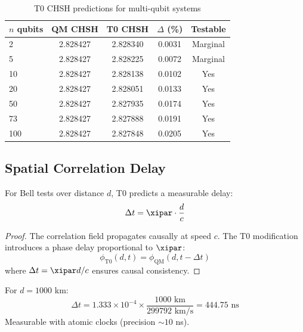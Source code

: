 \begin{table}[h]
	\centering
	\caption{T0 CHSH predictions for multi-qubit systems}
	\label{tab:chsh_predictions}
	\begin{tabular}{@{}lcccc@{}}
		\toprule
		$n$ qubits & QM CHSH & T0 CHSH & $\Delta$ (\%) & Testable \\
		\midrule
		2 & 2.828427 & 2.828340 & 0.0031 & Marginal \\
		5 & 2.828427 & 2.828225 & 0.0072 & Marginal \\
		10 & 2.828427 & 2.828138 & 0.0102 & Yes \\
		20 & 2.828427 & 2.828051 & 0.0133 & Yes \\
		50 & 2.828427 & 2.827935 & 0.0174 & Yes \\
		73 & 2.828427 & 2.827888 & 0.0191 & Yes \\
		100 & 2.828427 & 2.827848 & 0.0205 & Yes \\
		\bottomrule
	\end{tabular}
\end{table}

\subsection{Spatial Correlation Delay}

\begin{proposition}
	For Bell tests over distance $d$, T0 predicts a measurable delay:
	\begin{equation}
		\Delta t = \xipar \cdot \frac{d}{c}
		\label{eq:spatial_delay}
	\end{equation}
\end{proposition}

\begin{proof}
	The correlation field propagates causally at speed $c$. The T0 modification introduces a phase delay proportional to $\xipar$:
	\begin{equation}
		\phi_{\text{T0}}(d, t) = \phi_{\text{QM}}(d, t - \Delta t)
	\end{equation}
	where $\Delta t = \xipar d/c$ ensures causal consistency.
\end{proof}

\begin{experimentbox}
	For $d = 1000$ km:
	\begin{equation}
		\Delta t = 1.333 \times 10^{-4} \times \frac{1000 \text{ km}}{299792 \text{ km/s}} = 444.75 \text{ ns}
	\end{equation}
	Measurable with atomic clocks (precision $\sim 10$ ns).
\end{experimentbox}

